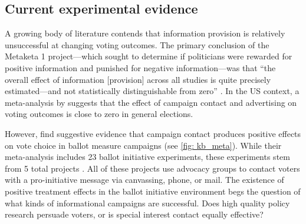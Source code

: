 \documentclass[12pt,final,fleqn]{article}
\theoremstyle{plain}
\begin{document}
\subsection{Current experimental evidence}  \label{sec: contact experiments}

A growing body of literature contends that information provision is relatively unsuccessful at changing voting outcomes. The primary conclusion of the Metaketa 1 project---which sought to determine if politicians were rewarded for positive information and punished for negative information---was that ``the overall effect of information [provision] across all studies is quite precisely estimated---and not statistically distinguishable from zero'' \citep{dunning2018metaketa}. In the US context, a meta-analysis by \citet{kalla2018minimal} suggests that the effect of campaign contact and advertising on voting outcomes is close to zero in general elections.


However, \citet{kalla2018minimal} find suggestive evidence that campaign contact produces positive effects on vote choice in ballot measure campaigns (see \autoref{fig: kb_meta}). While their meta-analysis includes 23 ballot initiative experiments, these experiments stem from 5 total projects \citep{arceneaux2005using, arceneaux2010comparing, rogers2015ballot}. All of these projects use advocacy groups to contact voters with a pro-initiative message via canvassing, phone, or mail. The existence of positive treatment effects in the ballot initiative environment begs the question of what kinds of informational campaigns are successful. Does high quality policy research persuade voters, or is special interest contact equally effective? 

%
%
\end{document}
